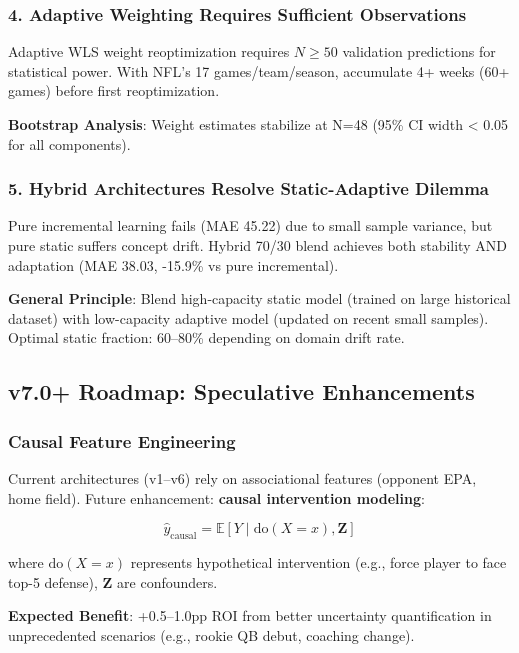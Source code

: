 \subsubsection{4. Adaptive Weighting Requires Sufficient Observations}

Adaptive WLS weight reoptimization requires $N \geq 50$ validation predictions for statistical power. With NFL's 17 games/team/season, accumulate 4+ weeks (60+ games) before first reoptimization.

\textbf{Bootstrap Analysis}: Weight estimates stabilize at N=48 (95\% CI width < 0.05 for all components).

\subsubsection{5. Hybrid Architectures Resolve Static-Adaptive Dilemma}

Pure incremental learning fails (MAE 45.22) due to small sample variance, but pure static suffers concept drift. Hybrid 70/30 blend achieves both stability AND adaptation (MAE 38.03, -15.9\% vs pure incremental).

\textbf{General Principle}: Blend high-capacity static model (trained on large historical dataset) with low-capacity adaptive model (updated on recent small samples). Optimal static fraction: 60--80\% depending on domain drift rate.

\subsection{v7.0+ Roadmap: Speculative Enhancements}

\subsubsection{Causal Feature Engineering}

Current architectures (v1--v6) rely on associational features (opponent EPA, home field). Future enhancement: \textbf{causal intervention modeling}:

\begin{equation}
\hat{y}_{\text{causal}} = \mathbb{E}[Y \mid \text{do}(X = x), \mathbf{Z}]
\label{eq:causal-intervention}
\end{equation}

where $\text{do}(X = x)$ represents hypothetical intervention (e.g., force player to face top-5 defense), $\mathbf{Z}$ are confounders.

\textbf{Expected Benefit}: +0.5--1.0pp ROI from better uncertainty quantification in unprecedented scenarios (e.g., rookie QB debut, coaching change).

